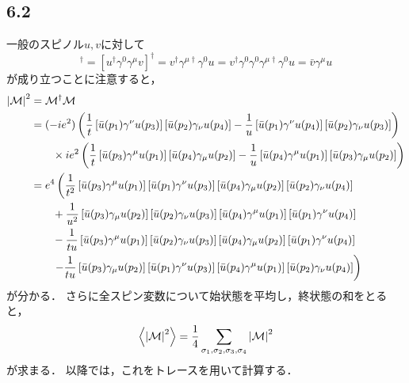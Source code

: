 \subsection*{6.2}
一般のスピノル$u,v$に対して
\begin{equation}
  [\bar{u}\gamma^{\mu} v]^{\dagger}
  = [u^{\dagger}\gamma^0 \gamma^{\mu} v]^{\dagger} = v^{\dagger} \gamma^{\mu\dagger}\gamma^0 u = v^{\dagger}\gamma^0 \gamma^0 \gamma^{\mu\dagger}\gamma^0 u = \bar{v} \gamma^{\mu} u
\end{equation}
が成り立つことに注意すると，
\begin{align}
  \left|\mathcal{M}\right|^2 &= \mathcal{M}^{\dagger} \mathcal{M} \notag\\
  &= (-ie^2) \left(\frac{1}{t}\left[\bar{u}(p_1)\gamma^{\nu} u(p_3)\right]  \left[\bar{u}(p_2)\gamma_{\nu} u(p_4)\right] 
  - \frac{1}{u}\left[\bar{u}(p_1)\gamma^{\nu} u(p_4)\right]  \left[\bar{u}(p_2)\gamma_{\nu} u(p_3)\right]\right)\notag\\
  &\qquad\times ie^2 \left(\frac{1}{t}\left[\bar{u}(p_3)\gamma^{\mu} u(p_1)\right]  \left[\bar{u}(p_4)\gamma_{\mu} u(p_2)\right] 
  - \frac{1}{u}\left[\bar{u}(p_4)\gamma^{\mu} u(p_1)\right]  \left[\bar{u}(p_3)\gamma_{\mu} u(p_2)\right]\right)\notag\\
  &= e^4\left(\frac{1}{t^2} \left[\bar{u}(p_3)\gamma^{\mu} u(p_1)\right]\left[\bar{u}(p_1)\gamma^{\nu} u(p_3)\right]\left[\bar{u}(p_4)\gamma_{\mu} u(p_2)\right]\left[\bar{u}(p_2)\gamma_{\nu} u(p_4)\right] \right.\notag\\
  &\qquad  +\frac{1}{u^2} \left[\bar{u}(p_3)\gamma_{\mu} u(p_2)\right]\left[\bar{u}(p_2)\gamma_{\nu} u(p_3)\right]\left[\bar{u}(p_4)\gamma^{\mu} u(p_1)\right] \left[\bar{u}(p_1)\gamma^{\nu} u(p_4)\right]\notag\\
  &\qquad -\frac{1}{tu} \left[\bar{u}(p_3)\gamma^{\mu} u(p_1)\right]  \left[\bar{u}(p_2)\gamma_{\nu} u(p_3)\right]\left[\bar{u}(p_4)\gamma_{\mu} u(p_2)\right]\left[\bar{u}(p_1)\gamma^{\nu} u(p_4)\right] \notag\\
  &\qquad \left.-\frac{1}{tu} \left[\bar{u}(p_3)\gamma_{\mu} u(p_2)\right]\left[\bar{u}(p_1)\gamma^{\nu} u(p_3)\right] \left[\bar{u}(p_4)\gamma^{\mu} u(p_1)\right] \left[\bar{u}(p_2)\gamma_{\nu} u(p_4)\right]\right)
\end{align}
が分かる．
さらに全スピン変数について始状態を平均し，終状態の和をとると，
\begin{equation}
  \ev{\left|\mathcal{M}\right|^2} = \frac{1}{4}\sum_{\sigma_1,\sigma_2,\sigma_3,\sigma_4} \left|\mathcal{M}\right|^2
\end{equation}
が求まる．
以降では，これをトレースを用いて計算する．

